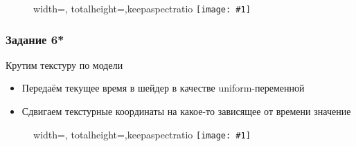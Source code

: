 \documentclass{beamer}
\newcommand{\slideimage}[1]{
  \begin{figure}
    \begin{adjustbox}{width=\textwidth, totalheight=\textheight-2\baselineskip-2\baselineskip,keepaspectratio}
      \texttt{[image: \#1]}
    \end{adjustbox}
  \end{figure}
}
\begin{document}
\begin{frame}[fragile]
\slideimage{5.png}
\end{frame}

\begin{frame}[fragile]
\frametitle{Задание 6*}
Крутим текстуру по модели
\begin{itemize}
\item Передаём текущее время в шейдер в качестве uniform-переменной
\item Сдвигаем текстурные координаты на какое-то зависящее от времени значение
\end{itemize}
\end{frame}

\begin{frame}[fragile]
\slideimage{6.png}
\end{frame}
\end{document}
